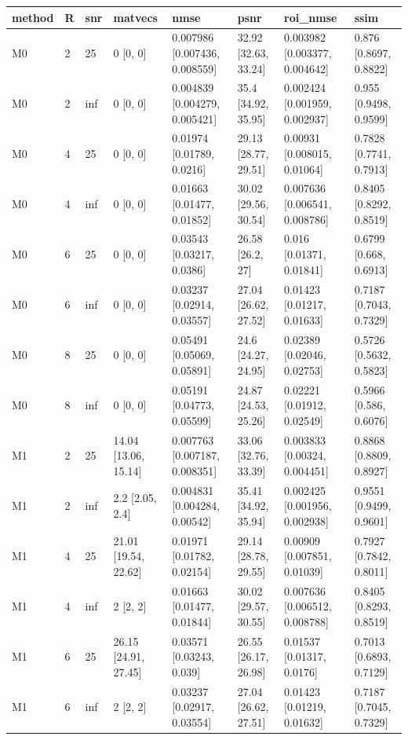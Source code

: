 \begin{tabular}{llllllll}
\hline
method & R & snr & matvecs & nmse & psnr & roi\_nmse & ssim \\
\hline
M0 & 2 & 25 & 0 [0, 0] & 0.007986 [0.007436, 0.008559] & 32.92 [32.63, 33.24] & 0.003982 [0.003377, 0.004642] & 0.876 [0.8697, 0.8822] \\
M0 & 2 & inf & 0 [0, 0] & 0.004839 [0.004279, 0.005421] & 35.4 [34.92, 35.95] & 0.002424 [0.001959, 0.002937] & 0.955 [0.9498, 0.9599] \\
M0 & 4 & 25 & 0 [0, 0] & 0.01974 [0.01789, 0.0216] & 29.13 [28.77, 29.51] & 0.00931 [0.008015, 0.01064] & 0.7828 [0.7741, 0.7913] \\
M0 & 4 & inf & 0 [0, 0] & 0.01663 [0.01477, 0.01852] & 30.02 [29.56, 30.54] & 0.007636 [0.006541, 0.008786] & 0.8405 [0.8292, 0.8519] \\
M0 & 6 & 25 & 0 [0, 0] & 0.03543 [0.03217, 0.0386] & 26.58 [26.2, 27] & 0.016 [0.01371, 0.01841] & 0.6799 [0.668, 0.6913] \\
M0 & 6 & inf & 0 [0, 0] & 0.03237 [0.02914, 0.03557] & 27.04 [26.62, 27.52] & 0.01423 [0.01217, 0.01633] & 0.7187 [0.7043, 0.7329] \\
M0 & 8 & 25 & 0 [0, 0] & 0.05491 [0.05069, 0.05891] & 24.6 [24.27, 24.95] & 0.02389 [0.02046, 0.02753] & 0.5726 [0.5632, 0.5823] \\
M0 & 8 & inf & 0 [0, 0] & 0.05191 [0.04773, 0.05599] & 24.87 [24.53, 25.26] & 0.02221 [0.01912, 0.02549] & 0.5966 [0.586, 0.6076] \\
M1 & 2 & 25 & 14.04 [13.06, 15.14] & 0.007763 [0.007187, 0.008351] & 33.06 [32.76, 33.39] & 0.003833 [0.00324, 0.004451] & 0.8868 [0.8809, 0.8927] \\
M1 & 2 & inf & 2.2 [2.05, 2.4] & 0.004831 [0.004284, 0.00542] & 35.41 [34.92, 35.94] & 0.002425 [0.001956, 0.002938] & 0.9551 [0.9499, 0.9601] \\
M1 & 4 & 25 & 21.01 [19.54, 22.62] & 0.01971 [0.01782, 0.02154] & 29.14 [28.78, 29.55] & 0.00909 [0.007851, 0.01039] & 0.7927 [0.7842, 0.8011] \\
M1 & 4 & inf & 2 [2, 2] & 0.01663 [0.01477, 0.01844] & 30.02 [29.57, 30.55] & 0.007636 [0.006512, 0.008788] & 0.8405 [0.8293, 0.8519] \\
M1 & 6 & 25 & 26.15 [24.91, 27.45] & 0.03571 [0.03243, 0.039] & 26.55 [26.17, 26.98] & 0.01537 [0.01317, 0.0176] & 0.7013 [0.6893, 0.7129] \\
M1 & 6 & inf & 2 [2, 2] & 0.03237 [0.02917, 0.03554] & 27.04 [26.62, 27.51] & 0.01423 [0.01219, 0.01632] & 0.7187 [0.7045, 0.7329] \\

\end{tabular}
